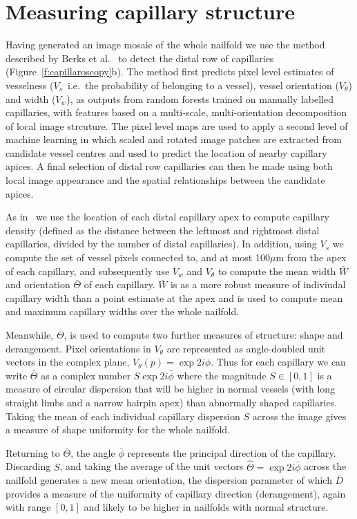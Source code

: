 \documentclass[runningheads,a4paper]{llncs}
\newcommand{\fref}[1]{Figure~\ref{#1}}
\newcommand*\mean[1]{\bar{#1}}
\def\ie{i.e.}
\begin{document}
\section{Measuring capillary structure}
\label{s:structure}
%
Having generated an image mosaic of the whole nailfold we use the method described by Berks et al.~\cite{Berks_MICCAI14} to detect the distal row of capillaries (\fref{f:capillaroscopy}b). The method first predicts pixel level estimates of vesselness ($V_s$~\ie~the probability of belonging to a vessel), vessel orientation ($V_\theta$) and width ($V_w$), as outputs from random forests trained on manually labelled capillaries, with features based on a multi-scale, multi-orientation decomposition of local image strcuture. The pixel level maps are used to apply a second level of machine learning in which scaled and rotated image patches are extracted from candidate vessel centres and used to predict the location of nearby capillary apices. A final selection of distal row capillaries can then be made using both local image appearance and the spatial relationships between the candidate apices.

As in~\cite{Berks_MICCAI14} we use the location of each distal capillary apex to compute capillary density (defined as the distance between the leftmost and rightmost distal capillaries, divided by the number of distal capillaries). In addition, using $V_s$ we compute the set of vessel pixels connected to, and at most 100$\mu$m from the apex of each capillary, and subsequently use $V_w$ and $V_\theta$ to compute the mean width $\mean{W}$ and orientation $\mean{\Theta}$ of each capillary. $\mean{W}$ is as a more robust measure of indiviudal capillary width than a point estimate at the apex and is used to compute mean and maximum capillary widths over the whole nailfold. 

Meanwhile, $\mean{\Theta}$, is used  to compute two further measures of structure: shape and derangement. Pixel orientations in $V_\theta$ are represented as angle-doubled unit vectors in the complex plane, $V_\theta(p) = \exp{2i\phi}$. Thus for each capillary  we can write $\mean{\Theta}$ as a complex number $S\exp{2i\mean{\phi}}$ where the magnitude  $S\in[0,1]$ is a measure of circular dispersion that will be higher in normal vessels (with long straight limbs and a narrow hairpin apex) than abnormally shaped capillaries. Taking the mean of each individual capillary dispersion $S$ across the image gives a measure of shape uniformity for the whole nailfold. 

Returning to $\mean{\Theta}$, the angle $\mean{\phi}$ represents the principal direction of the capillary. Discarding $S$, and taking the average of the unit vectors  $\hat{\Theta} = \exp{2i\mean{\phi}}$ across the nailfold generates a new mean orientation, the dispersion parameter of which $\mean{D}$ provides a measure of the uniformity of capillary direction (derangement), again with range $[0,1]$ and likely to be higher in nailfolds with normal structure.
\end{document}
